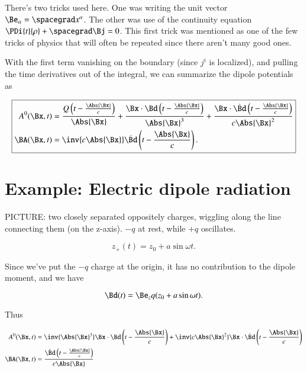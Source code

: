 There's two tricks used here.  One was writing the unit vector $\Be_\alpha = \spacegrad x^\alpha$.  The other was use of the continuity equation $\PDi{t}{\rho} + \spacegrad \Bj = 0$.  This first trick was mentioned as one of the few tricks of physics that will often be repeated since there aren't many good ones.

With the first term vanishing on the boundary (since $j^i$ is localized), and pulling the time derivatives out of the integral, we can summarize the dipole potentials as

\begin{equation}\label{eqn:relativisticElectrodynamicsL20:250}
\boxed{
\begin{aligned}
A^0(\Bx, t) &= \frac{Q\left(t - \frac{\Abs{\Bx} }{c}\right)}{\Abs{\Bx} } + \frac{\Bx \cdot \Bd\left(t - \frac{\Abs{\Bx} }{c}\right)}{\Abs{\Bx}^3} + \frac{\Bx \cdot \dot{\Bd}\left(t - \frac{\Abs{\Bx} }{c}\right)}{c \Abs{\Bx}^2} \\
\BA(\Bx, t) &= \inv{c \Abs{\Bx} } \dot{\Bd}\left(t - \frac{\Abs{\Bx} }{c}\right).
\end{aligned}
}
\end{equation}

\section{Example: Electric dipole radiation}

PICTURE: two closely separated oppositely charges, wiggling along the line connecting them (on the z-axis).  $-q$ at rest, while $+q$ oscillates.

\begin{equation}\label{eqn:relativisticElectrodynamicsL20:270}
z_+(t) = z_0 + a \sin\omega t.
\end{equation}

Since we've put the $-q$ charge at the origin, it has no contribution to the dipole moment, and we have

\begin{equation}\label{eqn:relativisticElectrodynamicsL20:290}
\Bd(t) = \Be_z q (z_0 + a \sin\omega t).
\end{equation}

Thus

\begin{align}\label{eqn:relativisticElectrodynamicsL20:310}
A^0(\Bx, t) &= \inv{\Abs{\Bx}^3} \Bx \cdot \Bd\left(t - \frac{\Abs{\Bx} }{c}\right) + \inv{c \Abs{\Bx}^2} \Bx \cdot \dot{\Bd}\left(t - \frac{\Abs{\Bx} }{c}\right) \\
\BA(\Bx, t) &= \frac{\dot{\Bd}\left(t - \frac{\Abs{\Bx} }{c}\right)}{c \Abs{\Bx} }
\end{align}

